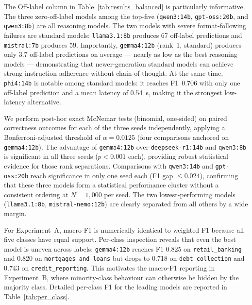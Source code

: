 \documentclass[a4paper,fleqn]{cas-dc}
\begin{document}
The Off-label column in Table~\ref{tab:results_balanced} is
particularly informative. The three zero-off-label models among
the top-five (\texttt{qwen3:14b}, \texttt{gpt-oss:20b}, and
\texttt{qwen3:8b}) are all reasoning models. The two models
with severe format-following failures are standard models:
\texttt{llama3.1:8b} produces 67 off-label predictions and
\texttt{mistral:7b} produces 59. Importantly, \texttt{gemma4:12b}
(rank~1, standard) produces only 3.7 off-label predictions on average
--- nearly as low as the best reasoning models --- demonstrating
that newer-generation standard models can achieve strong instruction
adherence without chain-of-thought. At the same time, \texttt{phi4:14b}
is notable among standard models: it reaches F1~0.706 with only one
off-label prediction and a mean latency of 0.54~s, making it the
strongest low-latency alternative.

We perform post-hoc exact McNemar tests (binomial, one-sided) on
paired correctness outcomes for each of the three seeds independently,
applying a Bonferroni-adjusted threshold of $\alpha{=}0.0125$ (four
comparisons anchored on \texttt{gemma4:12b}).
The advantage of \texttt{gemma4:12b} over \texttt{deepseek-r1:14b} and
\texttt{qwen3:8b} is significant in all three seeds ($p{<}0.001$ each),
providing robust statistical evidence for those rank separations.
Comparisons with \texttt{qwen3:14b} and \texttt{gpt-oss:20b} reach
significance in only one seed each (F1 gap $\leq 0.024$), confirming
that these three models form a statistical performance cluster without
a consistent ordering at $N{=}1{,}000$ per seed. The two lowest-performing
models (\texttt{llama3.1:8b}, \texttt{mistral-nemo:12b}) are clearly
separated from all others by a wide margin.

For Experiment~A, macro-F1 is numerically identical to weighted F1
because all five classes have equal support. Per-class inspection
reveals that even the best model is uneven across labels:
\texttt{gemma4:12b} reaches F1 0.825 on \texttt{retail\_banking} and
0.820 on \texttt{mortgages\_and\_loans} but drops to 0.718 on
\texttt{debt\_collection} and 0.743 on \texttt{credit\_reporting}.
This motivates the macro-F1 reporting in Experiment~B, where
minority-class behaviour can otherwise be hidden by the majority class.
Detailed per-class F1 for the leading models are reported in
Table~\ref{tab:per_class}.
\end{document}
